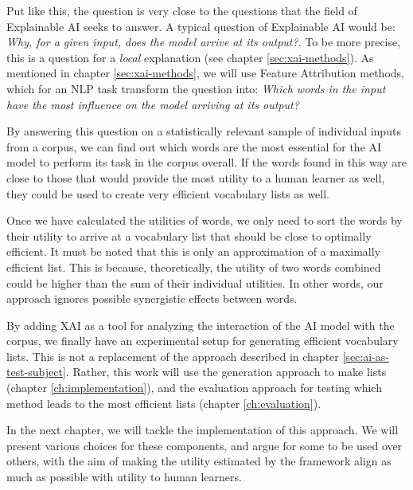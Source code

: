 Put like this, the question is very close to the questions that the field of Explainable AI seeks to answer.
A typical question of Explainable AI would be:
\textit{Why, for a given input, does the model arrive at its output?}. 
To be more precise, this is a question for a \textit{local} explanation (see chapter \ref{sec:xai-methods}).
As mentioned in chapter \ref{sec:xai-methods}, we will use Feature Attribution methods, which for an NLP task transform the question into:
\textit{Which words in the input have the most influence on the model arriving at its output?}

By answering this question on a statistically relevant sample of individual inputs from a corpus, we can find out which words are the most essential for the AI model to perform its task in the corpus overall.
If the words found in this way are close to those that would provide the most utility to a human learner as well, they could be used to create very efficient vocabulary lists as well.

Once we have calculated the utilities of words, we only need to sort the words by their utility to arrive at a vocabulary list that should be close to optimally efficient.
It must be noted that this is only an approximation of a maximally efficient list.
This is because, theoretically, the utility of two words combined could be higher than the sum of their individual utilities.
In other words, our approach ignores possible synergistic effects between words.

By adding XAI as a tool for analyzing the interaction of the AI model with the corpus, we finally have an experimental setup for generating efficient vocabulary lists.
This is not a replacement of the approach described in chapter \ref{sec:ai-as-test-subject}.
Rather, this work will use the generation approach to make lists (chapter \ref{ch:implementation}), and the evaluation approach for testing which method leads to the most efficient lists (chapter \ref{ch:evaluation}).

In the next chapter, we will tackle the implementation of this approach.
We will present various choices for these components, and argue for some to be used over others, with the aim of making the utility estimated by the framework align as much as possible with utility to human learners.

%
%

